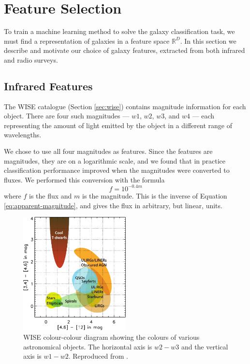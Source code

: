 
\section{Feature Selection}
\label{sec:features}

  To train a machine learning method to solve the galaxy classification task,
  we must find a representation of galaxies in a feature space $\mathbb{R}^D$.
  In this section we describe and motivate our choice of galaxy features,
  extracted from both infrared and radio surveys.

  \subsection{Infrared Features}
  \label{sec:ir-features}

    The WISE catalogue (Section \ref{sec:wise}) contains magnitude information
    for each object. There are four such magnitudes --- $w1$, $w2$, $w3$, and $w4$ ---
    each representing the amount of light emitted by the object in a different
    range of wavelengths.

    We chose to use all four magnitudes as features. Since the features are
    magnitudes, they are on a logarithmic scale, and we found that in practice
    classification performance improved when the magnitudes were converted to
    fluxes. We performed this conversion with the formula
    \[
      f = 10^{-0.4m}
    \]
    where $f$ is the flux and $m$ is the magnitude. This is the inverse of Equation \ref{eq:apparent-magnitude}, and gives the flux in arbitrary, but linear, units.

    \begin{figure}[!ht]
      \centering
      \includegraphics[width=0.5\textwidth]{images/wise_colour-colour}
      \caption{WISE colour-colour diagram showing the colours of various
        astronomical objects. The horizontal axis is $w2 - w3$ and the vertical
        axis is $w1 - w2$. Reproduced from \citep{wright10}.}
      \label{fig:wise-colour-colour}
    \end{figure}

